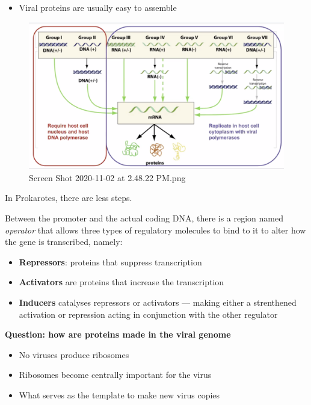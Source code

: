 \documentclass[letterpaper]{article}
\begin{document}
\begin{itemize}
\item Viral proteins are usually easy to assemble
\end{itemize}

\begin{figure}[htbp]
\centering
\includegraphics[width=.9\linewidth]{Screen Shot 2020-11-02 at 2.48.22 PM.png}
\caption{Screen Shot 2020-11-02 at 2.48.22 PM.png}
\end{figure}

In Prokarotes, there are less steps.

Between the promoter and the actual coding DNA, there is a region named
\emph{operator} that allows three types of regulatory molecules to bind to it
to alter how the gene is transcribed, namely:

\begin{itemize}
\item \textbf{Repressors}: proteins that suppress transcription
\item \textbf{Activators} are proteins that increase the transcription
\item \textbf{Inducers} catalyses repressors or activators --- making either a
strenthened activation or repression acting in conjunction with the
other regulator
\end{itemize}

\textbf{Question: how are proteins made in the viral genome}

\begin{itemize}
\item No viruses produce ribosomes
\item Ribosomes become centrally important for the virus
\item What serves as the template to make new virus copies
\end{itemize}
\end{document}
